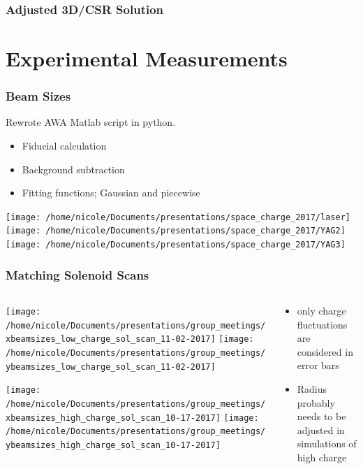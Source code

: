 \documentclass[professionalfonts,t]{beamer}
\newcommand{\secimage}{../../tex/images/awa_gun}
\begin{document}
\begin{frame}
	\frametitle{Adjusted 3D/CSR Solution}
\end{frame}
{
	\renewcommand{\secimage}{../../tex/images/YAG_screen}
\section{Experimental Measurements}
\begin{frame}
\frametitle{Beam Sizes}
Rewrote AWA Matlab script in python.
\begin{itemize}
	\item Fiducial calculation
	\item Background subtraction 
	\item Fitting functions; Gaussian and piecewise
\end{itemize}	

\vspace{1em}
\centering
\texttt{[image: /home/nicole/Documents/presentations/space\_charge\_2017/laser]}%
\texttt{[image: /home/nicole/Documents/presentations/space\_charge\_2017/YAG2]}%
\texttt{[image: /home/nicole/Documents/presentations/space\_charge\_2017/YAG3]}
\end{frame}

\begin{frame}[t]
\frametitle{Matching Solenoid Scans}
\begin{columns}[T]
\begin{column}{0.76\textwidth}
\begin{minipage}{0.5\textheight}
	\texttt{[image: /home/nicole/Documents/presentations/group\_meetings/xbeamsizes\_low\_charge\_sol\_scan\_11-02-2017]}	\texttt{[image: /home/nicole/Documents/presentations/group\_meetings/ybeamsizes\_low\_charge\_sol\_scan\_11-02-2017]}
\end{minipage}
\begin{minipage}{0.5\textheight}
	\texttt{[image: /home/nicole/Documents/presentations/group\_meetings/xbeamsizes\_high\_charge\_sol\_scan\_10-17-2017]}
	\texttt{[image: /home/nicole/Documents/presentations/group\_meetings/ybeamsizes\_high\_charge\_sol\_scan\_10-17-2017]}
\end{minipage}
\end{column}
\begin{column}{0.4\textwidth}
\begin{itemize}
	\item only charge fluctuations are considered in error bars 
	\item Radius probably needs to be adjusted in simulations of high charge
\end{itemize}
\end{column}
\end{columns}
\end{frame}

}
\end{document}
